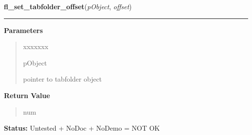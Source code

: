 \hspace{.8\funcindent}\begin{boxedminipage}{\funcwidth}

    \raggedright \textbf{fl\_set\_tabfolder\_offset}(\textit{pObject}, \textit{offset})

    \vspace{-1.5ex}

    \rule{\textwidth}{0.5\fboxrule}
\setlength{\parskip}{2ex}
\setlength{\parskip}{1ex}
      \textbf{Parameters}
      \vspace{-1ex}

      \begin{quote}
        \begin{Ventry}{xxxxxxx}

          \item[pObject]

          pointer to tabfolder object

        \end{Ventry}

      \end{quote}

      \textbf{Return Value}
    \vspace{-1ex}

      \begin{quote}
      num

      \end{quote}

\textbf{Status:} Untested + NoDoc + NoDemo = NOT OK



    \end{boxedminipage}

    \label{xformslib:library:fl_add_text}

    \vspace{0.5ex}

